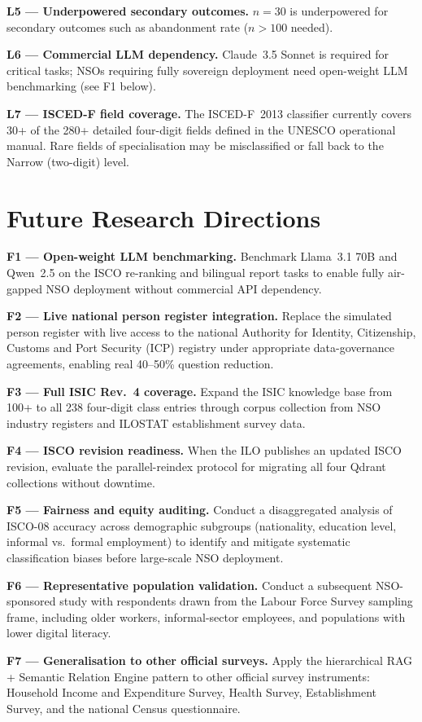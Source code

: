 \noindent\textbf{L5 --- Underpowered secondary outcomes.}
$n=30$ is underpowered for secondary outcomes such as abandonment rate ($n>100$
needed).

\noindent\textbf{L6 --- Commercial LLM dependency.}
Claude~3.5 Sonnet is required for critical tasks; NSOs requiring fully sovereign
deployment need open-weight LLM benchmarking (see F1 below).

\noindent\textbf{L7 --- ISCED-F field coverage.}
The ISCED-F~2013 classifier currently covers 30+ of the 280+ detailed four-digit
fields defined in the UNESCO operational manual. Rare fields of specialisation
may be misclassified or fall back to the Narrow (two-digit) level.

\section{Future Research Directions}
\label{sec:conc-future}

\noindent\textbf{F1 --- Open-weight LLM benchmarking.}
Benchmark Llama~3.1 70B and Qwen~2.5 on the ISCO re-ranking and bilingual
report tasks to enable fully air-gapped NSO deployment without commercial API
dependency.

\noindent\textbf{F2 --- Live national person register integration.}
Replace the simulated person register with live access to the national
Authority for Identity, Citizenship, Customs and Port Security (ICP) registry
under appropriate data-governance agreements, enabling real 40--50\% question
reduction.

\noindent\textbf{F3 --- Full ISIC Rev.~4 coverage.}
Expand the ISIC knowledge base from 100+ to all 238 four-digit class entries
through corpus collection from NSO industry registers and ILOSTAT establishment
survey data.

\noindent\textbf{F4 --- ISCO revision readiness.}
When the ILO publishes an updated ISCO revision, evaluate the parallel-reindex
protocol for migrating all four Qdrant collections without downtime.

\noindent\textbf{F5 --- Fairness and equity auditing.}
Conduct a disaggregated analysis of ISCO-08 accuracy across demographic
subgroups (nationality, education level, informal vs.\ formal employment) to
identify and mitigate systematic classification biases before large-scale NSO
deployment.

\noindent\textbf{F6 --- Representative population validation.}
Conduct a subsequent NSO-sponsored study with respondents drawn from the
Labour Force Survey sampling frame, including older workers, informal-sector
employees, and populations with lower digital literacy.

\noindent\textbf{F7 --- Generalisation to other official surveys.}
Apply the hierarchical RAG + Semantic Relation Engine pattern to other official
survey instruments: Household Income and Expenditure Survey, Health Survey,
Establishment Survey, and the national Census questionnaire.
